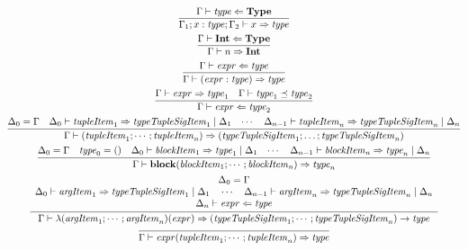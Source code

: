 \begin{gather*}
  \infer{\Gamma_1; x: \mathit{type}; \Gamma_2 \vdash x \Rightarrow \mathit{type}}{
    \Gamma \vdash \mathit{type} \Leftarrow \mathbf{Type}
  }
  \\
  \infer{\Gamma \vdash n \Rightarrow \mathbf{Int}}{
    \Gamma \vdash \mathbf{Int} \Leftarrow \mathbf{Type}
  }
  \\
  \infer{\Gamma \vdash (\mathit{expr}: \mathit{type}) \Rightarrow \mathit{type}}{
    \Gamma \vdash \mathit{expr} \Leftarrow \mathit{type}
  }
  \\
  \infer{\Gamma \vdash \mathit{expr} \Leftarrow \mathit{type}_2}{
    \Gamma \vdash \mathit{expr} \Rightarrow \mathit{type}_1
    &
    \Gamma \vdash \mathit{type}_1 \preceq \mathit{type}_2
  }
  \\
  \infer{\Gamma \vdash (\mathit{tupleItem}_1; \cdots; \mathit{tupleItem}_n) \Rightarrow (\mathit{typeTupleSigItem}_1; \ldots; \mathit{typeTupleSigItem}_n)}{
    \Delta_0 = \Gamma
    &
    \Delta_0 \vdash \mathit{tupleItem}_1 \Rightarrow \mathit{typeTupleSigItem}_1 \mid \Delta_1
    &
    \cdots
    &
    \Delta_{n - 1} \vdash \mathit{tupleItem}_n \Rightarrow \mathit{typeTupleSigItem}_n \mid \Delta_n
  }
  \\
  \infer{\Gamma \vdash \mathbf{block}(\mathit{blockItem}_1; \cdots; \mathit{blockItem}_n) \Rightarrow \mathit{type}_n}{
    \Delta_0 = \Gamma
    &
    \mathit{type}_0 = ()
    &
    \Delta_0 \vdash \mathit{blockItem}_1 \Rightarrow \mathit{type}_1 \mid \Delta_1
    &
    \cdots
    &
    \Delta_{n - 1} \vdash \mathit{blockItem}_n \Rightarrow \mathit{type}_n \mid \Delta_n
  }
  \\
  \infer{\Gamma \vdash \lambda(\mathit{argItem}_1; \cdots; \mathit{argItem}_n)(\mathit{expr}) \Rightarrow (\mathit{typeTupleSigItem}_1; \cdots; \mathit{typeTupleSigItem}_n) \rightarrow \mathit{type}}{
    \begin{array}{c}
      \Delta_0 = \Gamma
      \\
      \Delta_0 \vdash \mathit{argItem}_1 \Rightarrow \mathit{typeTupleSigItem}_1 \mid \Delta_1
      \hspace{1em}
      \cdots
      \hspace{1em}
      \Delta_{n - 1} \vdash \mathit{argItem}_n \Rightarrow \mathit{typeTupleSigItem}_n \mid \Delta_n
      \\
      \Delta_n \vdash \mathit{expr} \Leftarrow \mathit{type}
    \end{array}
  }
  \\
  \infer{\Gamma \vdash \mathit{expr}(\mathit{tupleItem}_1; \cdots; \mathit{tupleItem}_n) \Rightarrow \mathit{type}}{
}
\end{gather*}
